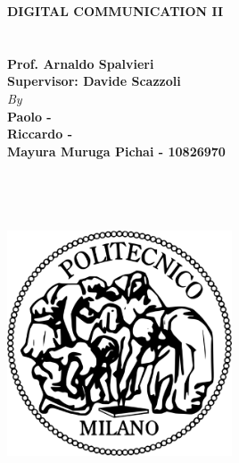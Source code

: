 \documentclass{article}
\begin{document}
\begin{titlepage}
\newcommand{\HRule}{\rule{\linewidth}{0.3mm}}
\center
\centering
\Large {\uppercase {\textbf{DIGITAL COMMUNICATION II}}}\\[0.5cm]
\vspace{+25mm}
\textbf{}\\
\vspace{15mm}
\Large{\\
\vspace{5mm}
\Large{\textbf{Prof. Arnaldo Spalvieri}}}\\
\Large{\textbf{Supervisor: Davide Scazzoli}}
\vspace{10mm}
\textbf{}\\
\emph{By}\\
\vspace{5mm}
\Large \textbf{Paolo - }\\
\Large \textbf{Riccardo - }\\
\Large \textbf{Mayura Muruga Pichai - 10826970}\\
\textbf{}\\
\vspace{2mm}
\text{}\\
\text{}\\
\textbf{}\\
\includegraphics[width=0.5\textwidth]{Figures/logo.png}\\
\vspace{4mm}

\end{titlepage}
\pagebreak
\end{document}
